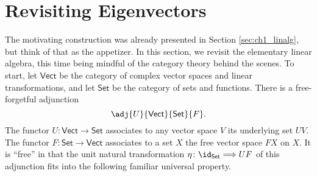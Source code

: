 \section{Revisiting Eigenvectors}\label{sec:5_LA}
The motivating construction was already presented in Section \ref{sec:ch1_linalg}, but think of that as the appetizer. In this section, we revisit the elementary linear algebra, this time being mindful of the category theory behind the scenes.  To start, let $\mathsf{Vect}$ be the category of complex vector spaces and linear transformations, and let $\mathsf{Set}$ be the category of sets and functions. There is a free-forgetful adjunction
\[\adj{U}{\mathsf{Vect}}{\mathsf{Set}}{F}.\]
The functor $U\colon \mathsf{Vect}\to\mathsf{Set}$ associates to any vector space $V$ its underlying set $UV$. The functor $F\colon \mathsf{Set}\to\mathsf{Vect}$ associates to a set $X$ the free vector space $FX$ on $X$. It is ``free'' in that the unit natural transformation $\eta\colon \id_{\mathsf{Set}}\Longrightarrow UF$ of this adjunction fits into the following familiar universal property.

